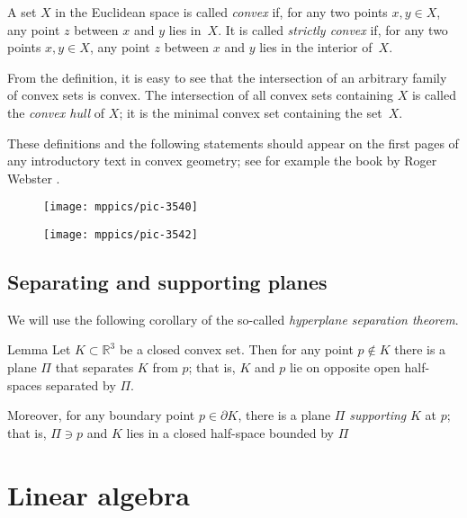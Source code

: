 \begin{multicols}{2}
{A set $X$ in the Euclidean space is called \emph{convex} if, for any two points $x,y\in X$, any point $z$ between $x$ and $y$ lies in~$X$.
It is called  {}\emph{strictly convex} if, for any two points $x,y\in X$, any point $z$ between $x$ and $y$ lies in the interior of~$X$.

From the definition, it is easy to see that the intersection of an arbitrary family of convex sets is convex. 
The intersection of all convex sets containing $X$ is called the \emph{convex hull} of $X$;
it is the minimal convex set containing the set~$X$.

These definitions and the following statements should appear on the first pages of any introductory text in convex geometry;
see for example the book by Roger Webster \cite{webster}.

\begin{figure*}[t!]
\begin{minipage}{.48\textwidth}
\centering
\texttt{[image: mppics/pic-3540]}
\end{minipage}\hfill
\begin{minipage}{.48\textwidth}
\centering
\texttt{[image: mppics/pic-3542]}
\end{minipage}
\end{figure*}

\subsection*{Separating and supporting planes}

We will use the following corollary of the so-called \emph{hyperplane separation theorem}.

\begin{thm}{Lemma}\label{lem:separation}
Let $K\subset \mathbb{R}^3$ be a closed convex set.
Then for any point $p\notin K$ there is a plane $\Pi$ that separates $K$ from $p$;
that is, $K$ and $p$ lie on opposite open half-spaces separated by $\Pi$.

Moreover, for any boundary point $p\in\partial K$, there is a plane $\Pi$ \emph{supporting} $K$ at $p$;
that is, $\Pi\ni p$ and $K$ lies in a closed half-space bounded by $\Pi$
\end{thm}


\section{Linear algebra}

}
\end{multicols}
